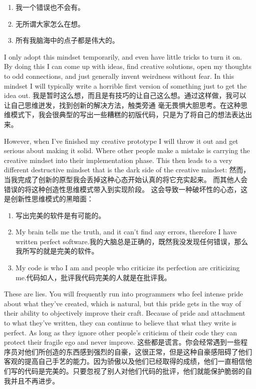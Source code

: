 \begin{enumerate}
\item 我一个错误也不会有。
\item 无所谓大家怎么在想。
\item 所有我脑海中的点子都是伟大的。
\end{enumerate}

I only adopt this mindset temporarily, and even have little tricks to turn it on.
By doing this I can come up with ideas, find creative solutions, open my thoughts
to odd connections, and just generally invent weirdness without fear.  In this
mindset I will typically write a horrible first version of something just to get
the idea out.
我是暂时这么想，而且是有技巧的让自己这么想。通过这样做，我可以让自己思维迸发，找到创新的解决方法，触类旁通
毫无畏惧大胆思考。在这种思维模式下，我会很典型的写出一些糟糕的初版代码，只是为了将自己的想法表达出来。

However, when I've finished my creative prototype I will throw it out and 
get serious about making it solid.  Where other people make a mistake is
carrying the creative mindset into their implementation phase.  This
then leads to a very different destructive mindset that is the dark side
of the creative mindset:
然而，当我完成了创新的原型我会丢掉这种心态开始认真的将它充实起来。 而其他人会错误的将这种创造性思维模式带入到实现阶段。
这会导致一种破坏性的心态，这是创新性思维模式的黑暗面：

\begin{enumerate}
\item 写出完美的软件是有可能的。
\item My brain tells me the truth, and it can't find any errors, therefore I have written perfect software.我的大脑总是正确的，既然我没发现任何错误，那么我所写的就是完美的软件。
\item My code is who I am and people who criticize its perfection are criticizing me.代码如人，批评我代码完美的人就是在批评我。
\end{enumerate}

These are lies.  You will frequently run into programmers who feel intense
pride about what they've created, which is natural, but this pride gets in the
way of their ability to objectively improve their craft.  Because of pride and
attachment to what they've written, they can continue to believe that what they
write is perfect.  As long as they ignore other people's criticism of their
code they can protect their fragile ego and never improve.
这些都是谎言。你会经常遇到一些程序员对他们所创造的东西感到强烈的自豪，这很正常，但是这种自豪感阻碍了他们客观的提高自己手艺的能力。因为骄傲以及他们已经取得的成绩，他们一直相信他们写的代码是完美的。只要忽视了别人对他们代码的批评，他们就能保护脆弱的自我并且不再进步。

